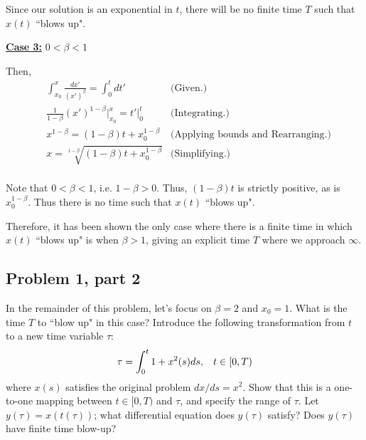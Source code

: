 \begin{solution}
Since our solution is an exponential in $t$, there will be no finite time $T$ such that $x(t)$ ``blows up".

\underline{\textbf{Case 3:}} $0 < \beta < 1$

Then,
\begin{align}
    &\int_{x_0}^x \frac{dx'}{(x')^\beta} = \int_0^t dt' &\text{(Given.)}\nonumber\\
    &\frac{1}{1 - \beta}(x')^{1 - \beta}\bigg|_{x_0}^x = t' \bigg|_0^t &\text{(Integrating.)}\nonumber\\
    &x^{1 - \beta} = (1 - \beta)t + x_0^{1 - \beta} &\text{(Applying bounds and Rearranging.)} \nonumber\\
    &x = \sqrt[1 - \beta]{(1 - \beta)t + x_0^{1 - \beta}} &\text{(Simplifying.)}\nonumber\\
\end{align}

Note that $0 < \beta < 1$, i.e. $1 - \beta > 0$. Thus, $(1 - \beta)t$ is strictly positive, as is $x_0^{1 - \beta}$. Thus there is no time such that $x(t)$ ``blows up".

\alignbreak

Therefore, it has been shown the only case where there is a finite time in which $x(t)$ ``blows up" is when $\beta > 1$, giving an explicit time $T$ where we approach $\infty$.

\jump
\end{solution}%

\partbreak
\subsection{Problem 1, part 2}
In the remainder of this problem, let's focus on $\beta = 2$  and $x_0 = 1$. What is the time $T$ to ``blow up" in this case? Introduce the following transformation from $t$ to a new time variable $\tau$:
\[
\tau = \int_0^t 1 + x^2(s) ds, \hspace{3mm} t\in [0,T)
\]
where $x(s)$ satisfies the original problem $dx/ds = x^2$. Show that this is a one-to-one mapping between $t \in [0, T)$ and $\tau$, and specify the range of $\tau$. Let $y(\tau) = x(t(\tau))$; what differential equation does $y(\tau)$ satisfy? Does $y(\tau)$ have finite time blow-up? 

